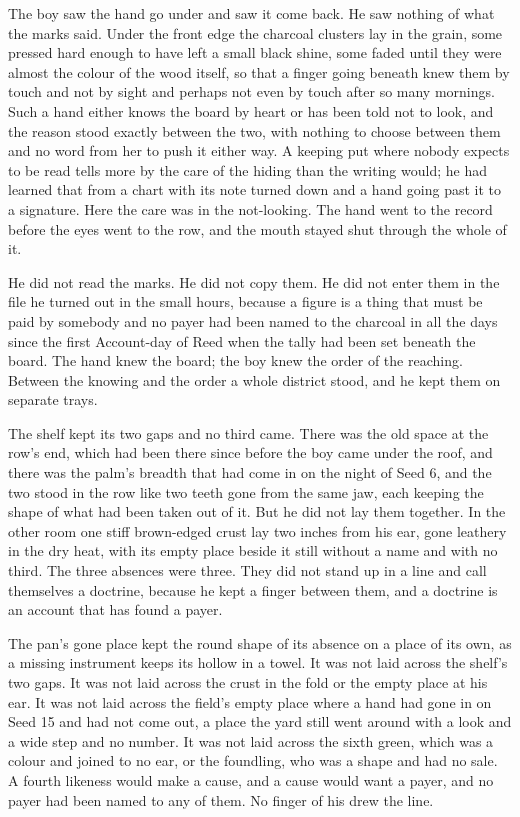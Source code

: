 The boy saw the hand go under and saw it come back. He saw nothing of what the marks said. Under the front edge the charcoal clusters lay in the grain, some pressed hard enough to have left a small black shine, some faded until they were almost the colour of the wood itself, so that a finger going beneath knew them by touch and not by sight and perhaps not even by touch after so many mornings. Such a hand either knows the board by heart or has been told not to look, and the reason stood exactly between the two, with nothing to choose between them and no word from her to push it either way. A keeping put where nobody expects to be read tells more by the care of the hiding than the writing would; he had learned that from a chart with its note turned down and a hand going past it to a signature. Here the care was in the not-looking. The hand went to the record before the eyes went to the row, and the mouth stayed shut through the whole of it.

He did not read the marks. He did not copy them. He did not enter them in the file he turned out in the small hours, because a figure is a thing that must be paid by somebody and no payer had been named to the charcoal in all the days since the first Account-day of Reed when the tally had been set beneath the board. The hand knew the board; the boy knew the order of the reaching. Between the knowing and the order a whole district stood, and he kept them on separate trays.

\scenebreak

The shelf kept its two gaps and no third came. There was the old space at the row's end, which had been there since before the boy came under the roof, and there was the palm's breadth that had come in on the night of Seed 6, and the two stood in the row like two teeth gone from the same jaw, each keeping the shape of what had been taken out of it. But he did not lay them together. In the other room one stiff brown-edged crust lay two inches from his ear, gone leathery in the dry heat, with its empty place beside it still without a name and with no third. The three absences were three. They did not stand up in a line and call themselves a doctrine, because he kept a finger between them, and a doctrine is an account that has found a payer.

The pan's gone place kept the round shape of its absence on a place of its own, as a missing instrument keeps its hollow in a towel. It was not laid across the shelf's two gaps. It was not laid across the crust in the fold or the empty place at his ear. It was not laid across the field's empty place where a hand had gone in on Seed 15 and had not come out, a place the yard still went around with a look and a wide step and no number. It was not laid across the sixth green, which was a colour and joined to no ear, or the foundling, who was a shape and had no sale. A fourth likeness would make a cause, and a cause would want a payer, and no payer had been named to any of them. No finger of his drew the line.

